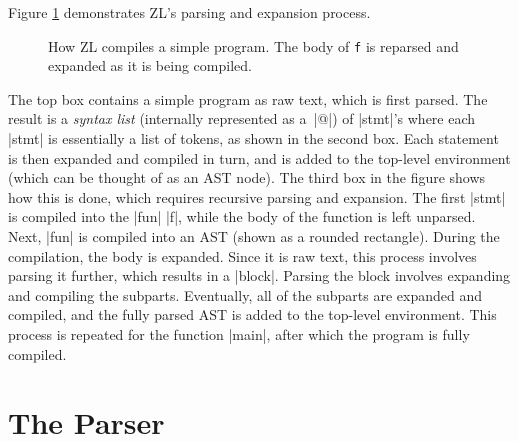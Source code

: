 Figure \ref{fig} demonstrates ZL's parsing and expansion process.  
\begin{figure}
\begin{center}
\UndefineShortVerb{\|}

\DefineShortVerb{\|}
\end{center}
\caption{How ZL compiles a simple program.  The body of \texttt{f} is
  reparsed and expanded as it is being compiled.}
\label{fig}
\end{figure}
The top box contains a simple program as raw text, which is first parsed.
The result is a \textit{syntax list} (internally represented as a~|@|)
of |stmt|'s where each |stmt| is essentially a list of tokens, as
shown in the second box.  Each statement is then expanded and compiled
in turn, and is added to the top-level environment (which can be
thought of as an AST node). The third box in the figure shows how this
is done, which requires recursive parsing and expansion.  The first
|stmt| is compiled into the |fun| |f|, while the body of the function
is left unparsed.  Next, |fun| is compiled into an AST (shown as a
rounded rectangle).  During the compilation, the body is expanded.
Since it is raw text, this process involves parsing it further, which
results in a |block|.  Parsing the block involves expanding and
compiling the subparts.  Eventually, all of the subparts are
expanded and compiled, and the fully parsed AST is added to the
top-level environment.  This process is repeated for the function
|main|, after which the program is fully compiled.
\section{The Parser}
\label{parser}

